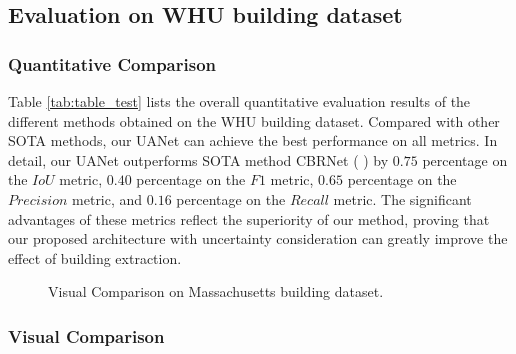 \documentclass[lettersize,journal]{IEEEtran}
\begin{document}
\subsection{Evaluation on WHU building dataset}
\subsubsection{Quantitative Comparison}
Table \ref{tab:table_test} lists the overall quantitative evaluation results of the different methods obtained on the WHU building dataset. Compared with other SOTA methods, our UANet can achieve the best performance on all metrics. In detail, our UANet outperforms SOTA method CBRNet ( \cite{CBRNet}) by $0.75$ percentage on the $IoU$ metric, $0.40$ percentage on the $F1$ metric, $0.65$ percentage on the $Precision$ metric, and $0.16$ percentage on the $Recall$ metric. The significant advantages of these metrics reflect the superiority of our method, proving that our proposed architecture with uncertainty consideration can greatly improve the effect of building extraction.

\begin{figure*}
\centering
{}
\hfil
{}
\hfil
{}
\hfil
{}
\hfil
{}
\hfil
{}
\hfil
{}
\hfil
\caption{Visual Comparison on Massachusetts building dataset.}
\label{fig_tp_mass}
\vspace{-0.5em}
\end{figure*}

\subsubsection{Visual Comparison}
\end{document}
